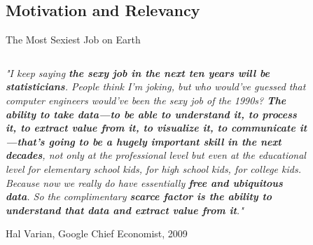 \documentclass[main.tex]{subfiles}
\begin{document}
    \subsection{Motivation and Relevancy}
    
    \begin{frame}{The Most Sexiest Job on Earth}
        \begin{columns}
            \begin{column}{.6\textwidth}
                \begin{justify}
                    \textit{"I keep saying \textbf{the sexy job in the next ten years will be statisticians}. People think I’m joking, but who would’ve guessed that computer engineers would’ve been the sexy job of the 1990s? \textbf{The ability to take data—to be able to understand it, to process it, to extract value from it, to visualize it, to communicate it—that’s going to be a hugely important skill in the next decades}, not only at the professional level but even at the educational level for elementary school kids, for high school kids, for college kids. Because now we really do have essentially \textbf{free and ubiquitous data}. So the complimentary \textbf{scarce factor is the ability to understand that data and extract value from it}."}
                    \vspace*{1mm}
                    
                    Hal Varian, Google Chief Economist, 2009
                \end{justify}
            \end{column}
            \begin{column}{.4\textwidth}
                \begin{figure}
                    \label{fig:hal-varian}
                    \includegraphics[width=.6\textwidth,cframe=gray]{figures/external/hal-varian.jpg}
                \end{figure}
            \end{column}
        \end{columns}
    \end{frame}
\end{document}
